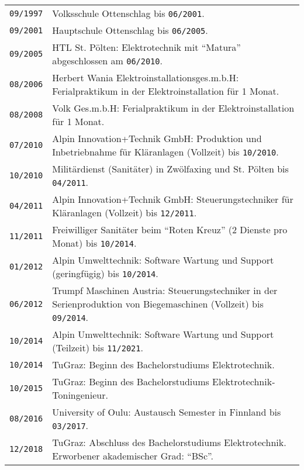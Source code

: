 {
\vspace*{0.75cm}
\\\\
\begin{tabularx}{\columnwidth}{>{\centering\arraybackslash}p{1.5cm} | p{12cm}}
  \texttt{09/1997} & Volksschule Ottenschlag bis \texttt{06/2001}.\\
  \texttt{09/2001} & Hauptschule Ottenschlag bis \texttt{06/2005}.\\
  \texttt{09/2005} & HTL St. Pölten: Elektrotechnik mit \enquote{Matura} abgeschlossen am \texttt{06/2010}.\\
  \texttt{08/2006} & Herbert Wania Elektroinstallationsges.m.b.H: Ferialpraktikum in der Elektroinstallation für 1 Monat.\\
  \texttt{08/2008} & Volk Ges.m.b.H: Ferialpraktikum in der Elektroinstallation für 1 Monat.\\
  \texttt{07/2010} & Alpin Innovation+Technik GmbH: Produktion und Inbetriebnahme für Kläranlagen (Vollzeit) bis \texttt{10/2010}.\\
  \texttt{10/2010} & Militärdienst (Sanitäter) in Zwölfaxing und St. Pölten bis \texttt{04/2011}.\\
  \texttt{04/2011} & Alpin Innovation+Technik GmbH: Steuerungstechniker für Kläranlagen (Vollzeit) bis \texttt{12/2011}.\\
  \texttt{11/2011} & Freiwilliger Sanitäter beim \enquote{Roten Kreuz} (2 Dienste pro Monat) bis \texttt{10/2014}.\\
  \texttt{01/2012} & Alpin Umwelttechnik: Software Wartung und Support (geringfügig) bis \texttt{10/2014}.\\
  \texttt{06/2012} & Trumpf Maschinen Austria: Steuerungstechniker in der Serienproduktion von Biegemaschinen (Vollzeit) bis \texttt{09/2014}.\\
  \texttt{10/2014} & Alpin Umwelttechnik: Software Wartung und Support (Teilzeit) bis \texttt{11/2021}.\\
  \texttt{10/2014} & TuGraz: Beginn des Bachelorstudiums Elektrotechnik.\\
  \texttt{10/2015} & TuGraz: Beginn des Bachelorstudiums Elektrotechnik-Toningenieur.\\
  \texttt{08/2016} & University of Oulu: Austausch Semester in Finnland bis \texttt{03/2017}.\\
  \texttt{12/2018} & TuGraz: Abschluss des Bachelorstudiums Elektrotechnik. Erworbener akademischer Grad: \enquote{BSc}.\\

\end{tabularx}}
